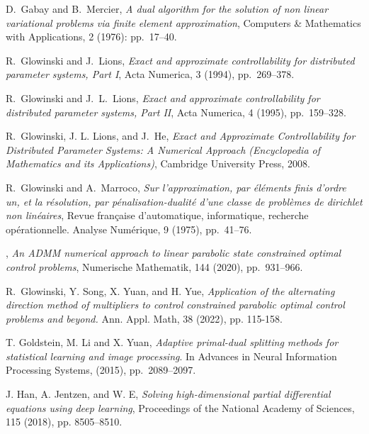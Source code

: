 \documentclass[final]{siamart171218}
\theoremstyle{remark}
\begin{document}
\begin{thebibliography}{10}
	{ D.~Gabay and B.~Mercier}, {\em A dual algorithm for the solution of non linear variational problems via finite element approximation}, Computers \& Mathematics with Applications, 2 (1976): pp.~17--40.
	
	
	{ R.~Glowinski and J.~Lions}, {\em Exact and approximate controllability for
		distributed parameter systems, Part I}, Acta Numerica, 3 (1994), pp.~269--378.
	
	{ R.~Glowinski and J.~L.~Lions}, {\em Exact and approximate controllability for distributed parameter systems, Part II}, Acta Numerica, 4 (1995), pp.~159--328.
	
	

	

	
	{ R.~Glowinski, J. L. Lions, and J.~He}, {\em Exact and Approximate
		Controllability for Distributed Parameter Systems: A Numerical Approach
		(Encyclopedia of Mathematics and its Applications)}, Cambridge University
	Press, 2008.
	
	{ R.~Glowinski and A.~Marroco}, {\em Sur l'approximation, par {\'e}l{\'e}ments finis d'ordre un, et la r{\'e}solution, par p{\'e}nalisation-dualit{\'e} d'une classe de probl{\`e}mes de dirichlet non lin{\'e}aires}, Revue fran{\c{c}}aise d'automatique, informatique, recherche
	op{\'e}rationnelle. Analyse Num{\'e}rique, 9 (1975), pp.~41--76.
	
	, {\em An ADMM numerical approach to linear parabolic state constrained optimal control problems}, Numerische Mathematik, 144 (2020), pp.~931--966.
	
	R.~Glowinski, Y. Song, X. Yuan, and H. Yue, {\em Application of the alternating direction method of multipliers to control constrained parabolic optimal control problems and beyond.} Ann. Appl. Math, 38 (2022), pp. 115-158.
	
	{ T. Goldstein, M. Li and X. Yuan},
	{\em  Adaptive primal-dual splitting methods for statistical learning and
	image processing}.
	In  Advances in Neural Information Processing Systems, (2015),
	pp.~2089--2097.
		
		J. Han, A. Jentzen, and W. E, {\em Solving high-dimensional partial differential equations using
		deep learning}, Proceedings of the National Academy of Sciences, 115 (2018), pp. 8505--8510.
		

\end{thebibliography}
\end{document}
